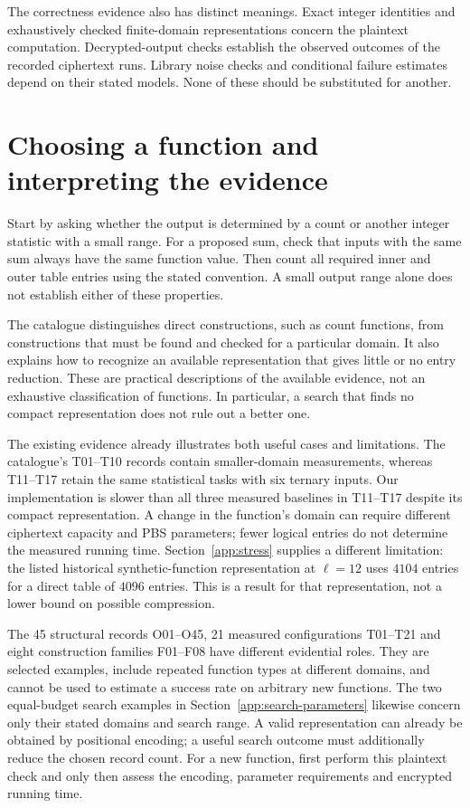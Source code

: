 \documentclass[11pt,a4paper]{article}
\newcommand{\appadd}[1]{{\color{blue}#1}}
\newcommand{\appadd}[1]{#1}
\begin{document}
The correctness evidence also has distinct meanings. Exact integer identities and exhaustively checked finite-domain representations concern the plaintext computation. Decrypted-output checks establish the observed outcomes of the recorded ciphertext runs. Library noise checks and conditional failure estimates depend on their stated models. None of these should be substituted for another.

\appadd{\section*{Choosing a function and interpreting the evidence}
Start by asking whether the output is determined by a count or another integer statistic with a small range. For a proposed sum, check that inputs with the same sum always have the same function value. Then count all required inner and outer table entries using the stated convention. A small output range alone does not establish either of these properties.

The catalogue distinguishes direct constructions, such as count functions, from constructions that must be found and checked for a particular domain. It also explains how to recognize an available representation that gives little or no entry reduction. These are practical descriptions of the available evidence, not an exhaustive classification of functions. In particular, a search that finds no compact representation does not rule out a better one.

The existing evidence already illustrates both useful cases and limitations. The catalogue's T01--T10 records contain smaller-domain measurements, whereas T11--T17 retain the same statistical tasks with six ternary inputs. Our implementation is slower than all three measured baselines in T11--T17 despite its compact representation. A change in the function's domain can require different ciphertext capacity and PBS parameters; fewer logical entries do not determine the measured running time. Section~\ref{app:stress} supplies a different limitation: the listed historical synthetic-function representation at $\ell=12$ uses $4104$ entries for a direct table of $4096$ entries. This is a result for that representation, not a lower bound on possible compression.

The 45 structural records O01--O45, 21 measured configurations T01--T21 and eight construction families F01--F08 have different evidential roles. They are selected examples, include repeated function types at different domains, and cannot be used to estimate a success rate on arbitrary new functions. The two equal-budget search examples in Section~\ref{app:search-parameters} likewise concern only their stated domains and search range. A valid representation can already be obtained by positional encoding; a useful search outcome must additionally reduce the chosen record count. For a new function, first perform this plaintext check and only then assess the encoding, parameter requirements and encrypted running time.}
\end{document}
